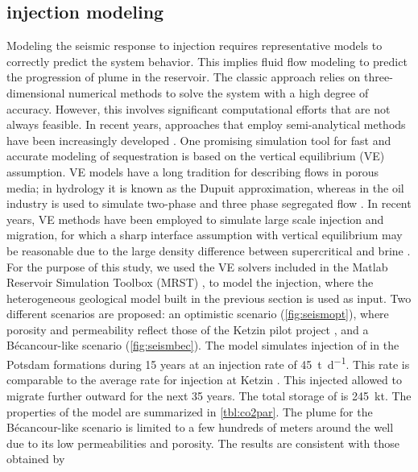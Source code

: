 \subsection{\texorpdfstring{}{CO2} injection modeling}
Modeling the seismic response to  injection requires representative
models to correctly predict the system behavior. This implies fluid flow
modeling to predict the progression of  plume in the reservoir. The
classic approach relies on three-dimensional numerical methods to solve the
system with a high degree of accuracy. However, this involves significant
computational efforts that are not always feasible. In recent years, approaches
that employ semi-analytical methods have been increasingly developed
\citep{Nordbotten2005a, Nordbotten2009}. One promising simulation tool for fast
and accurate modeling of  sequestration is based on the vertical
equilibrium (VE) assumption. VE models have a long tradition for describing
flows in porous media; in hydrology it is known as the Dupuit approximation,
whereas in the oil industry is used to simulate two-phase and three phase
segregated flow \citep{Martin1958,Coats1967,Martin1968}. In recent years, VE
methods have been employed to simulate large scale  injection and
migration, for which a sharp interface assumption with vertical equilibrium may
be reasonable due to the large density difference between supercritical 
and brine \citep{Nordbotten2005a,Celia2006, Nordbotten2006}.\\
For the purpose of this study, we used the VE solvers included in the Matlab
Reservoir Simulation Toolbox (MRST) \citep{Lie2011}, to model the 
injection, where the heterogeneous geological model built in the previous
section is used as input. Two different scenarios are proposed: an optimistic
scenario (\cref{fig:seismopt}), where  porosity and permeability reflect those
of the Ketzin pilot project \citep{Michael_2010}, and a Bé\-can\-cour-like
scenario (\cref{fig:seismbec}). The model simulates injection of  in the
Potsdam formations during \num{15} years at an injection rate of
\SI{45}{\tonne\per\day}. This rate is comparable to the average rate for
injection at Ketzin \citep{Martens_2012}. This injected  allowed to
migrate further outward for the next \num{35} years. The total storage of
 is \SI{245}{\kilo\tonne}. The properties of the model are summarized in
\cref{tbl:co2par}. The  plume for the Bé\-can\-cour-like scenario is
limited to a few hundreds of meters around the well due to its low
permeabilities and porosity. The results are consistent with those obtained by
